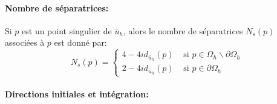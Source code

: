 \paragraph{Nombre de séparatrices:} Si $p$ est un point singulier de $\bar{u}_h$, alors le nombre de séparatrices $N_s(p)$ associées à $p$ est donné par:
\begin{equation}
    N_s(p) = 
    \left\{
    \begin{array}{ll}
    4-4id_{\bar{u}_h}(p) & \mbox{ si } p\in\Omega_h\backslash\partial\Omega_h\\[0.3cm]
    2-4id_{\bar{u}_h}(p) & \mbox{ si } p\in\partial\Omega_h
    \end{array}
    \right.
\end{equation}

\paragraph{Directions initiales et intégration:}

